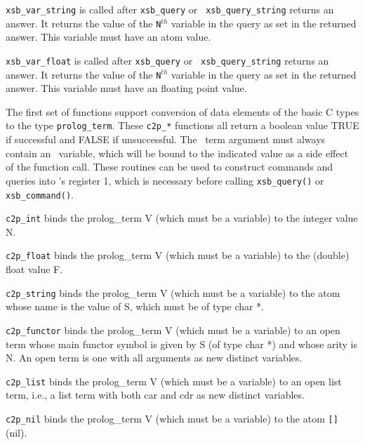 \begin{description}
 
    {\tt xsb\_var\_string} is called after {\tt xsb\_query} or {\tt
xsb\_query\_string} returns an answer.  It returns the value of the
{\tt N}$^{th}$ variable in the query as set in the returned answer.
This variable must have an atom value.

 
    {\tt xsb\_var\_float} is called after {\tt xsb\_query} or {\tt
xsb\_query\_string} returns an answer.  It returns the value of the
{\tt N}$^{th}$ variable in the query as set in the returned answer.
This variable must have an floating point value.


\end{description}


The first set of functions support conversion of data elements of the
basic C types to the type {\tt prolog\_term}.  These {\tt c2p\_*}
functions all return a boolean value TRUE if successful and FALSE if
unsuccessful.  The \ourprolog\ term argument must always contain an
\ourprolog\ variable, which will be bound to the indicated value as a
side effect of the function call.  These routines can be used to
construct commands and queries into \ourprolog 's register 1, which is
necessary before calling {\tt xsb\_query()} or {\tt xsb\_command()}.

\begin{description}
 
    {\tt c2p\_int} binds the prolog\_term V (which must be a variable)
    to the integer value N.

 
    {\tt c2p\_float} binds the prolog\_term V (which must be a variable)
    to the (double) float value F.

 
    {\tt c2p\_string} binds the prolog\_term V (which must be a
    variable) to the atom whose name is the value of S, which must be
    of type char *.

 
    {\tt c2p\_functor} binds the prolog\_term V (which must be a
    variable) to an open term whose main functor symbol is given by S
    (of type char *) and whose arity is N.  An open term is one with
    all arguments as new distinct variables.

 
    {\tt c2p\_list} binds the prolog\_term V (which must be a variable)
    to an open list term, i.e., a list term with both car and cdr as
    new distinct variables.

 
    {\tt c2p\_nil} binds the prolog\_term V (which must be a
    variable) to the atom \verb|[]| (nil).
\end{description}

